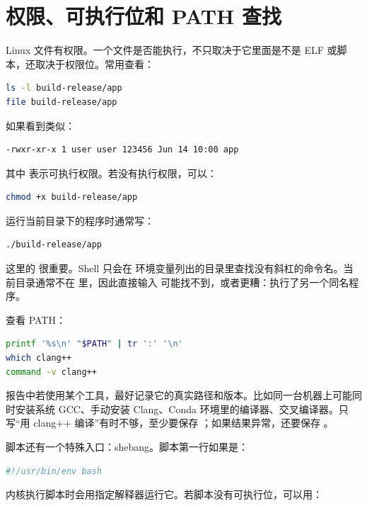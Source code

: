 \section{权限、可执行位和 PATH 查找}

Linux 文件有权限。一个文件是否能执行，不只取决于它里面是不是 ELF 或脚本，还取决于权限位。常用查看：

\begin{lstlisting}[language=bash]
ls -l build-release/app
file build-release/app
\end{lstlisting}

如果看到类似：

\begin{lstlisting}
-rwxr-xr-x 1 user user 123456 Jun 14 10:00 app
\end{lstlisting}

其中  表示可执行权限。若没有执行权限，可以：

\begin{lstlisting}[language=bash]
chmod +x build-release/app
\end{lstlisting}

运行当前目录下的程序时通常写：

\begin{lstlisting}[language=bash]
./build-release/app
\end{lstlisting}

这里的  很重要。Shell 只会在  环境变量列出的目录里查找没有斜杠的命令名。当前目录通常不在  里，因此直接输入  可能找不到，或者更糟：执行了另一个同名程序。

查看 PATH：

\begin{lstlisting}[language=bash]
printf '%s\n' "$PATH" | tr ':' '\n'
which clang++
command -v clang++
\end{lstlisting}

报告中若使用某个工具，最好记录它的真实路径和版本。比如同一台机器上可能同时安装系统 GCC、手动安装 Clang、Conda 环境里的编译器、交叉编译器。只写“用 clang++ 编译”有时不够，至少要保存 ；如果结果异常，还要保存 。

脚本还有一个特殊入口：shebang。脚本第一行如果是：

\begin{lstlisting}[language=bash]
#!/usr/bin/env bash
\end{lstlisting}

内核执行脚本时会用指定解释器运行它。若脚本没有可执行位，可以用：

